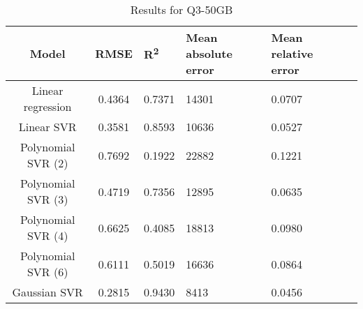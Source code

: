 \begin{table}[H]
\centering
\begin{adjustbox}{center}
\begin{tabular}{c | c M{1.2cm} M{2.5cm} M{2.5cm} M{1.8cm}}
Model & RMSE & R\textsuperscript{2} & Mean absolute error & Mean relative error \tabularnewline
\hline
Linear regression & 0.4364 & 0.7371 &  14301 & 0.0707 \\
Linear SVR & 0.3581 & 0.8593 &  10636 & 0.0527 \\
Polynomial SVR (2) & 0.7692 & 0.1922 &  22882 & 0.1221 \\
Polynomial SVR (3) & 0.4719 & 0.7356 &  12895 & 0.0635 \\
Polynomial SVR (4) & 0.6625 & 0.4085 &  18813 & 0.0980 \\
Polynomial SVR (6) & 0.6111 & 0.5019 &  16636 & 0.0864 \\
Gaussian SVR & 0.2815 & 0.9430 &   8413 & 0.0456 \\
\end{tabular}
\end{adjustbox}
\\
\caption{Results for Q3-50GB}
\label{tab:all_linear_Q3_50}
\end{table}
